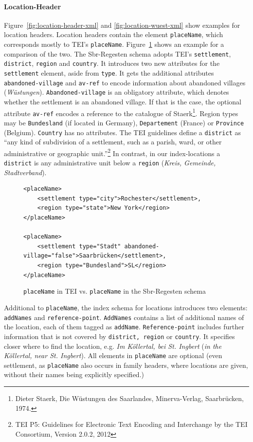 \paragraph{Location-Header}
\label{sec:location-header}
Figure~\ref{fig:location-header-xml} and \ref{fig:location-wuest-xml}
show examples for location headers. Location headers contain the
element \texttt{placeName}, which corresponds mostly to TEI's
\texttt{placeName}. Figure~\ref{fig:placeName} shows an example for a
comparison of the two. The Sbr-Regesten schema adopts TEI's
\texttt{settlement}, \texttt{district}, \texttt{region} and
\texttt{country}. It introduces two new attributes for the
\texttt{settlement} element, aside from \texttt{type}. It gets the
additional attributes \texttt{abandoned-village} and \texttt{av-ref}
to encode information about abandoned villages (\textit{Wüstungen}).
\texttt{Abandoned-village} is an obligatory attribute, which denotes
whether the settlement is an abandoned village. If that is the case,
the optional attribute \texttt{av-ref} encodes a reference to the
catalogue of Staerk\footnote{Dieter Staerk, Die Wüstungen des
  Saarlandes, Minerva-Verlag, Saarbrücken, 1974.}. Region types may be
\texttt{Bundesland} (if located in Germany), \texttt{Departement}
(France) or \texttt{Province} (Belgium). \texttt{Country} has no
attributes. The TEI guidelines define a \texttt{district} as “any kind
of subdivision of a settlement, such as a parish, ward, or other
administrative or geographic unit.”\footnote{TEI P5: Guidelines for
  Electronic Text Encoding and Interchange by the TEI Consortium,
  Version 2.0.2, 2012} In contrast, in our index-locations a
\texttt{district} is any administrative unit below a \texttt{region}
(\textit{Kreis, Gemeinde, Stadtverband}).

\begin{figure}[H]
\centering
\begin{verbatim}
<placeName>
    <settlement type="city">Rochester</settlement>,
    <region type="state">New York</region>
</placeName>

<placeName>
    <settlement type="Stadt" abandoned-village="false">Saarbrücken</settlement>,
    <region type="Bundesland">SL</region>
</placeName>
\end{verbatim}
\caption{\texttt{placeName} in TEI vs. \texttt{placeName} in the
  Sbr-Regesten schema}
\label{fig:placeName}
\end{figure}

Additional to \texttt{placeName}, the index schema for locations
introduces two elements: \texttt{addNames} and
\texttt{reference-point}. \texttt{AddNames} contains a list of
additional names of the location, each of them tagged as
\texttt{addName}. \texttt{Reference-point} includes further
information that is not covered by \texttt{district, region} or
\texttt{country}. It specifies closer where to find the location, e.g.
\textit{Im Köllertal, bei St. Ingbert} (\textit{in the Köllertal, near
  St. Ingbert}). All elements in \texttt{placeName} are optional (even
settlement, as \texttt{placeName} also occurs in family headers, where
locations are given, without their names being explicitly specified.)

